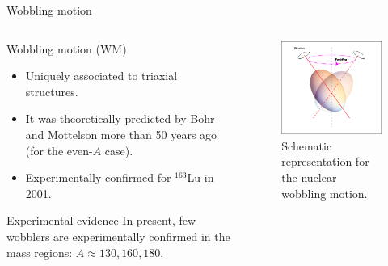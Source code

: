 \documentclass{beamer}
\begin{document}
\begin{frame}{Wobbling motion}

\begin{columns}
    \begin{column}{0.5\textwidth}
    \begin{block}{Wobbling motion (WM)}
  \begin{itemize}
    \item Uniquely associated to triaxial structures. 
    \item It was theoretically predicted by Bohr and Mottelson more than 50 years ago (for the even-$A$ case).
    \item Experimentally confirmed for $^{163}$Lu in 2001.
  \end{itemize}
  \end{block}
  \begin{exampleblock}{Experimental evidence}
  In present, few wobblers are experimentally confirmed in the mass regions: $A\approx130,160,180$.
  \end{exampleblock}
  \end{column}
  \begin{column}{0.5\textwidth}
        \begin{figure}
          \centering
          \includegraphics[scale=0.35]{figs/wobbling_drawing.png}
          \caption{Schematic representation for the nuclear wobbling motion.}
          \label{wobbling_picture}
      \end{figure}
  \end{column}
  \end{columns}
\end{frame}
\end{document}
